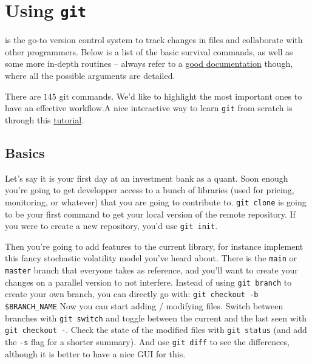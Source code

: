 \section{Using \texttt{git}}

\begin{tcolorbox}[width=\linewidth, sharp corners=all, colback=white!95!black]
     is the go-to version control system to track changes in files and collaborate with other programmers.
    Below is a list of the basic survival commands, as well as some more in-depth routines -- always refer to a \href{https://git-scm.com/docs}{good documentation} though, where all the possible arguments are detailed.
\end{tcolorbox}

There are $145$ git commands. We'd like to highlight the most important ones to have an effective workflow.\newline A nice interactive way to learn \texttt{git} from scratch is through this \href{https://learngitbranching.js.org/}{tutorial}.

\subsection*{Basics}

Let's say it is your first day at an investment bank as a quant. Soon enough you're going to get developper access to a bunch of libraries (used for pricing, monitoring, or whatever) that you are going to contribute to.\newline
\texttt{git clone}\newline
is going to be your first command to get your local version of the remote repository. If you were to create a new repository, you'd use \texttt{git init}.

Then you're going to add features to the current library, for instance implement this fancy stochastic volatility model you've heard about. There is the \texttt{main} or \texttt{master} branch that everyone takes as reference, and you'll want to create your changes on a parallel version to not interfere. Instead of using \texttt{git branch} to create your own branch, you can directly go with:\newline
\texttt{git checkout -b \$BRANCH_NAME}\newline
Now you can start adding / modifying files. Switch between branches with \texttt{git switch} and toggle between the current and the last seen with \texttt{git checkout -}. Check the state of the modified files with \texttt{git status} (and add the \texttt{-s} flag for a shorter summary). And use \texttt{git diff} to see the differences, although it is better to have a nice GUI for this.

